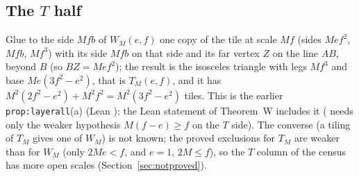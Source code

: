 \documentclass[11pt,reqno]{amsart}
\theoremstyle{plain}
\theoremstyle{definition}
\begin{document}
\subsection{The $T$ half}\label{sub:Tcor}
Glue to the side $Mfb$ of $W_M(e,f)$ one copy of the tile at scale $Mf$ (sides $Mef^2$, $Mfb$, $Mf^3$) with its side $Mfb$ on that side and its far vertex $Z$ on the line $AB$, beyond $B$ (so $BZ=Mef^2$); the result is the isosceles triangle with legs $Mf^3$ and base $Me(3f^2-e^2)$, that is $T_M(e,f)$, and it has $M^2(2f^2-e^2)+M^2f^2=M^2(3f^2-e^2)$ tiles.
This is the earlier \texttt{prop:layerall}(a) (Lean ); the Lean statement of Theorem~W includes it ( needs only the weaker hypothesis $M(f-e)\ge f$ on the $T$ side).
The converse (a tiling of $T_M$ gives one of $W_M$) is not known; the proved exclusions for $T_M$ are weaker than for $W_M$ (only $2Me<f$, and $e=1$, $2M\le f$), so the $T$ column of the census has more open scales (Section~\ref{sec:notproved}).
\end{document}
